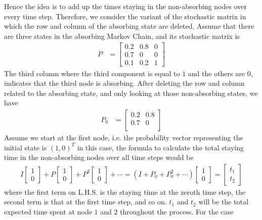 Hence the idea is to add up the times staying in the non-absorbing nodes over every time step. Therefore, we consider the variant of the stochastic matrix in which the row and column of the absorbing state are deleted. Assume that there are three states in the absorbing Markov Chain, and its stochastic matrix is
\begin{align*}
P &= 
\begin{bmatrix}
0.2 & 0.8 & 0 \\
0.7 & 0 & 0 \\
0.1 & 0.2 & 1
\end{bmatrix}
\end{align*}
The third column where the third component is equal to $1$ and the others are $0$, indicates that the third node is absorbing. After deleting the row and column related to the absorbing state, and only looking at those non-absorbing states, we have
\begin{align*}
P_0 &= 
\begin{bmatrix}
0.2 & 0.8\\
0.7 & 0 \\
\end{bmatrix}   
\end{align*}
Assume we start at the first node, i.e. the probability vector representing the initial state is $(1, 0)^T$ in this case, the formula to calculate the total staying time in the non-absorbing nodes over all time steps would be
\begin{align*}
I
\begin{bmatrix}
1 \\
0
\end{bmatrix}
+
P
\begin{bmatrix}
1 \\
0
\end{bmatrix}
+
P^2
\begin{bmatrix}
1 \\
0
\end{bmatrix}
+ \cdots 
=
(I + P_0 + P_0^2 + \cdots)
\begin{bmatrix}
1 \\
0
\end{bmatrix}
=
\begin{bmatrix}
t_1 \\
t_2
\end{bmatrix}
\end{align*}
where the first term on L.H.S. is the staying time at the zeroth time step, the second term is that at the first time step, and so on. $t_1$ and $t_2$ will be the total expected time spent at node $1$ and $2$ throughout the process. For the case
